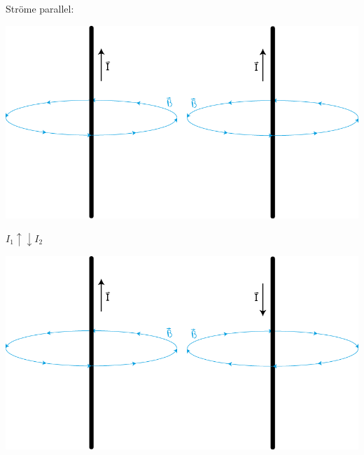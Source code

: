 Ströme parallel:\\
\begin{center}
	\includegraphics[width=0.4\linewidth]{skizzen/16/16_2B05}
\end{center}
$ I_1 \uparrow\downarrow I_2 $ \\
\begin{center}
	\includegraphics[width=0.4\linewidth]{skizzen/16/16_2B06}
\end{center}

